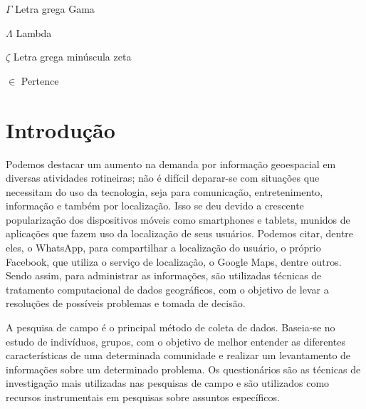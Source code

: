 \documentclass[
	12pt,				%
    oneside,			%
	a4paper,			%
	english,			%
	french,				%
	spanish,			%
	brazil,				%
	]{abntex2}
\begin{document}
\begin{simbolos}
  \item[$ \Gamma $] Letra grega Gama
  \item[$ \Lambda $] Lambda
  \item[$ \zeta $] Letra grega minúscula zeta
  \item[$ \in $] Pertence
\end{simbolos}


\tableofcontents*


\textual


\chapter{Introdução} %

Podemos destacar um aumento na demanda por informação geoespacial em diversas atividades rotineiras; não é difícil deparar-se com situações que necessitam do uso da tecnologia, seja para comunicação, entretenimento, informação e também por localização. Isso se deu devido a crescente popularização dos dispositivos móveis como smartphones e tablets, munidos de aplicações que fazem uso da localização de seus usuários. Podemos citar, dentre eles, o WhatsApp, para compartilhar a localização do usuário, o próprio Facebook, que utiliza o serviço de localização, o Google Maps, dentre outros. Sendo assim, para administrar as informações, são utilizadas técnicas de tratamento computacional de dados geográficos, com o objetivo de levar a resoluções de possíveis problemas e tomada de decisão.

A pesquisa de campo é o principal método de coleta de dados. Baseia-se no estudo de indivíduos, grupos, com o objetivo de melhor entender as diferentes características de uma determinada comunidade e realizar um levantamento de informações sobre um determinado problema. Os questionários são as técnicas de investigação mais utilizadas nas pesquisas de campo e são utilizados como recursos instrumentais em pesquisas sobre assuntos específicos.
\end{document}
